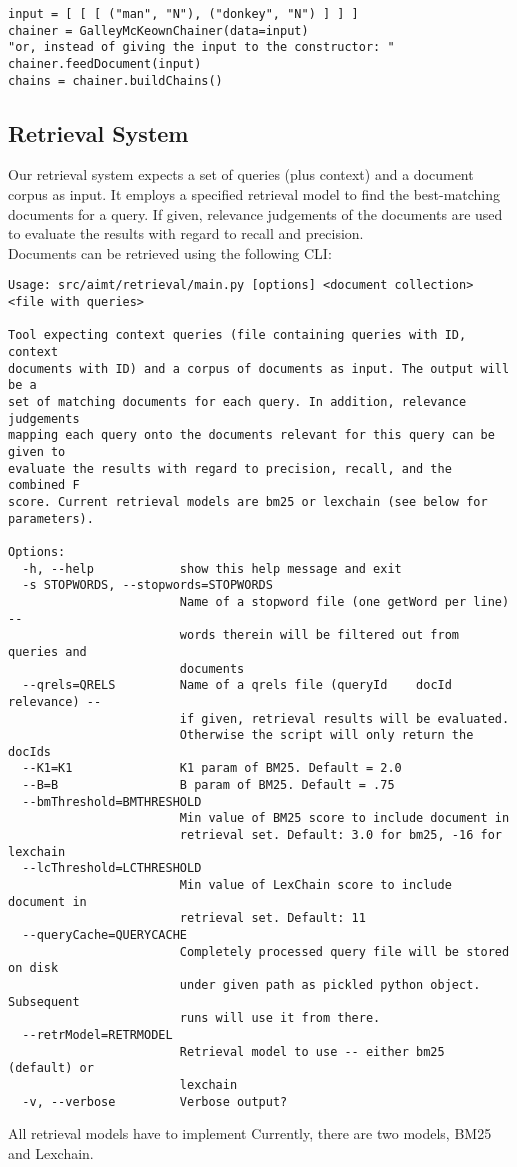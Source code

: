 \documentclass[11pt, a4paper, abstraction]{scrartcl}
\begin{document}
\lstset{language=Python}
\begin{lstlisting}
input = [ [ [ ("man", "N"), ("donkey", "N") ] ] ]
chainer = GalleyMcKeownChainer(data=input)
"or, instead of giving the input to the constructor: "
chainer.feedDocument(input)
chains = chainer.buildChains()
\end{lstlisting}

\subsection{Retrieval System}

Our retrieval system expects a set of queries (plus context) and a document corpus as input. It employs a specified retrieval model to find the best-matching documents for a query. If given, relevance judgements of the documents are used to evaluate the results with regard to recall and precision. \\   
Documents can be retrieved using the following CLI: 

\begin{verbatim} 
Usage: src/aimt/retrieval/main.py [options] <document collection> <file with queries>

Tool expecting context queries (file containing queries with ID, context
documents with ID) and a corpus of documents as input. The output will be a
set of matching documents for each query. In addition, relevance judgements
mapping each query onto the documents relevant for this query can be given to
evaluate the results with regard to precision, recall, and the combined F
score. Current retrieval models are bm25 or lexchain (see below for
parameters).

Options:
  -h, --help            show this help message and exit
  -s STOPWORDS, --stopwords=STOPWORDS
                        Name of a stopword file (one getWord per line) --
                        words therein will be filtered out from queries and
                        documents
  --qrels=QRELS         Name of a qrels file (queryId    docId   relevance) --
                        if given, retrieval results will be evaluated.
                        Otherwise the script will only return the docIds
  --K1=K1               K1 param of BM25. Default = 2.0
  --B=B                 B param of BM25. Default = .75
  --bmThreshold=BMTHRESHOLD
                        Min value of BM25 score to include document in
                        retrieval set. Default: 3.0 for bm25, -16 for lexchain
  --lcThreshold=LCTHRESHOLD
                        Min value of LexChain score to include document in
                        retrieval set. Default: 11
  --queryCache=QUERYCACHE
                        Completely processed query file will be stored on disk
                        under given path as pickled python object. Subsequent
                        runs will use it from there.
  --retrModel=RETRMODEL
                        Retrieval model to use -- either bm25 (default) or
                        lexchain
  -v, --verbose         Verbose output?
\end{verbatim}
\noindent
All retrieval models have to implement 
Currently, there are two models, BM25 and Lexchain.
\end{document}
